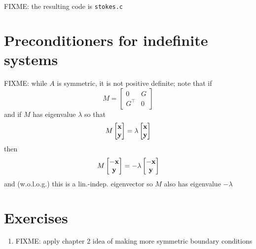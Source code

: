 FIXME: the resulting code is \texttt{stokes.c}


\section{Preconditioners for indefinite systems}

FIXME: while $A$ is symmetric, it is not positive definite; note that if
    $$M = \begin{bmatrix} 0 & G \\ G^\top & 0 \end{bmatrix}$$
and if $M$ has eigenvalue $\lambda$ so that
    $$M \begin{bmatrix} \mathbf{x} \\ \mathbf{y} \end{bmatrix} = \lambda \begin{bmatrix} \mathbf{x} \\ \mathbf{y} \end{bmatrix}$$
then
    $$M \begin{bmatrix} -\mathbf{x} \\ \mathbf{y} \end{bmatrix} = - \lambda \begin{bmatrix} -\mathbf{x} \\ \mathbf{y} \end{bmatrix}$$
and (w.o.l.o.g.) this is a lin.-indep. eigenvector so $M$ also has eigenvalue $-\lambda$


\section{Exercises}

\renewcommand{\labelenumi}{\arabic{chapter}.\arabic{enumi}\quad}
\begin{enumerate}
\item FIXME: apply chapter 2 idea of making more symmetric boundary conditions
\end{enumerate}
